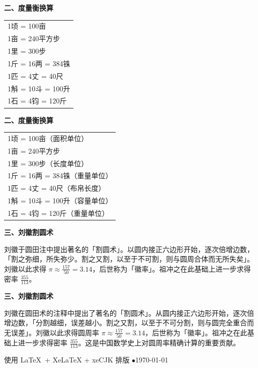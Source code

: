 \documentclass[10pt,a4paper]{article}
\newlength{\lw}
\newlength{\rw}
\newcommand{\biling}[2]{%
  \par\vspace{0.2em}%
  \noindent%
  \colorbox{classicalbg}{\parbox{\dimexpr\lw-2\fboxsep\relax}{#1}}%
  \hfill%
  \colorbox{modernbg}{\parbox{\dimexpr\rw-2\fboxsep\relax}{#2}}%
  \vspace{0.2em}%
}
\newcommand{\sk}{\vspace{0.1em}}
\begin{document}
\biling{
\textbf{二、度量衡换算}

\begin{tabular}{@{}l@{}}
1顷 = 100亩 \\[1pt]
1亩 = 240平方步 \\[1pt]
1里 = 300步 \\[1pt]
1斤 = 16两 = 384铢 \\[1pt]
1匹 = 4丈 = 40尺 \\[1pt]
1斛 = 10斗 = 100升 \\[1pt]
1石 = 4钧 = 120斤 \\[1pt]
\end{tabular}
}{
\textbf{二、度量衡换算}

\begin{tabular}{@{}l@{}}
1顷 = 100亩（面积单位） \\[1pt]
1亩 = 240平方步 \\[1pt]
1里 = 300步（长度单位） \\[1pt]
1斤 = 16两 = 384铢（重量单位） \\[1pt]
1匹 = 4丈 = 40尺（布帛长度） \\[1pt]
1斛 = 10斗 = 100升（容量单位） \\[1pt]
1石 = 4钧 = 120斤（重量单位） \\[1pt]
\end{tabular}
}

\sk

\biling{
\textbf{三、刘徽割圆术}

刘徽于圆田注中提出著名的「割圆术」。以圆内接正六边形开始，逐次倍增边数，「割之弥细，所失弥少。割之又割，以至于不可割，则与圆周合体而无所失矣」。刘徽以此求得 $\pi \approx \frac{157}{50} = 3.14$，后世称为「徽率」。祖冲之在此基础上进一步求得密率 $\frac{355}{113}$。
}{
\textbf{三、刘徽割圆术}

刘徽在圆田术的注释中提出了著名的「割圆术」。从圆内接正六边形开始，逐次倍增边数，「分割越细，误差越小。割之又割，以至于不可分割，则与圆完全重合而无误差」。刘徽以此求得圆周率 $\pi \approx \frac{157}{50} = 3.14$，后世称为「徽率」。祖冲之在此基础上进一步求得密率 $\frac{355}{113}$。这是中国数学史上对圆周率精确计算的重要贡献。
}

\vspace{0.8em}

\begin{center}
{\small 使用 \LaTeX\ + XeLaTeX + xeCJK 排版 \quad$\bullet$\quad \today}
\end{center}
\end{document}
